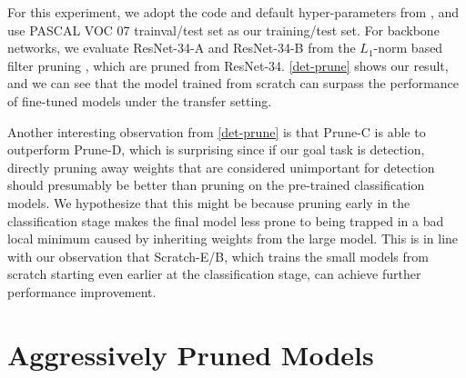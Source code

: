 For this experiment, we adopt the code and default hyper-parameters from \cite{jjfaster2rcnn}, and use PASCAL VOC 07 trainval/test set as our training/test set. For backbone networks, we evaluate ResNet-34-A and ResNet-34-B from the $L_1$-norm based filter pruning \citep{li2016pruning}, which are pruned from ResNet-34.
\autoref{det-prune} shows our result, and we can see that the model trained from scratch can surpass the performance of fine-tuned models under the transfer setting.
\vspace{-1ex}

Another interesting observation from \autoref{det-prune} is that Prune-C is able to outperform Prune-D, which is surprising since if our goal task is detection, directly pruning away weights that are considered unimportant for detection should presumably be better than pruning on the pre-trained classification models. We hypothesize that this might be because pruning early in the classification stage makes the final model less prone to being trapped in a bad local minimum caused by inheriting weights from the large model. This is in line with our observation that Scratch-E/B, which trains the small models from scratch starting even earlier at the classification stage, can achieve further performance improvement.

\section{Aggressively Pruned Models}

